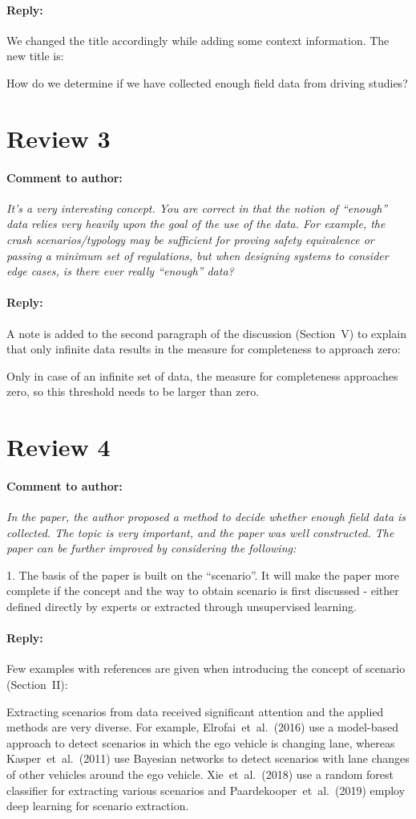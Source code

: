 \documentclass[10pt,final,a4paper,oneside,onecolumn]{article}
\newcommand{\toauthor}{\paragraph*{Comment to author:} \itshape}
\newcommand{\fromauthor}{\paragraph*{Reply:} \normalfont}
\newcommand{\cstart}{\color{red}}
\newcommand{\cend}{\color{black}}
\begin{document}
\fromauthor We changed the title accordingly while adding some context information. The new title is:

\cstart
How do we determine if we have collected enough field data from driving studies?
\cend

\section*{Review 3}

\toauthor It's a very interesting concept. You are correct in that the notion of ``enough'' data relies very heavily upon the goal of the use of the data. For example, the crash scenarios/typology may be sufficient for proving safety equivalence or passing a minimum set of regulations, but when designing systems to consider edge cases, is there ever really ``enough'' data? 

\fromauthor A note is added to the second paragraph of the discussion (Section~V) to explain that only infinite data results in the measure for completeness to approach zero:

\cstart Only in case of an infinite set of data, the measure for completeness approaches zero, so this threshold needs to be larger than zero. \cend

\section*{Review 4}

\toauthor In the paper, the author proposed a method to decide whether enough field data is collected. The topic is very important, and the paper was well constructed. The paper can be further improved by considering the following:

1. The basis of the paper is built on the ``scenario''. It will make the paper more complete if the concept and the way to obtain scenario is first discussed - either defined directly by experts or extracted through unsupervised learning.

\fromauthor Few examples with references are given when introducing the concept of scenario (Section~II):

\cstart 
Extracting scenarios from data received significant attention and the applied methods are very diverse. For example, Elrofai~et~al.\ (2016) use a model-based approach to detect scenarios in which the ego vehicle is changing lane, whereas Kasper~et~al.\ (2011) use Bayesian networks to detect scenarios with lane changes of other vehicles around the ego vehicle. Xie~et~al.\ (2018) use a random forest classifier for extracting various scenarios and Paardekooper~et~al.\ (2019) employ deep learning for scenario extraction. 
\cend
\end{document}
